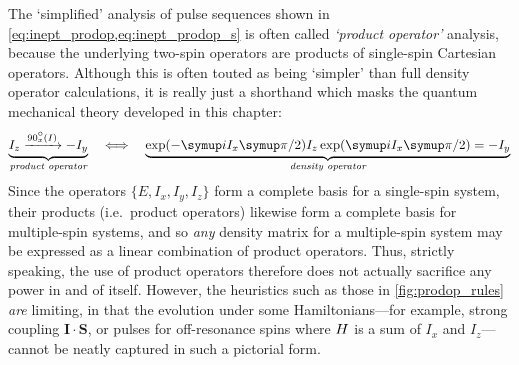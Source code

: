 The `simplified' analysis of pulse sequences shown in \cref{eq:inept_prodop,eq:inept_prodop_s} is often called \textit{`product operator'} analysis\autocite{Sorensen1984PNMRS}, because the underlying two-spin operators are products of single-spin Cartesian operators.
Although this is often touted as being `simpler' than full density operator calculations, it is really just a shorthand which masks the quantum mechanical theory developed in this chapter:
\begin{equation}
    \label{eq:product_operator_shorthand}
    \underbrace{I_z \xrightarrow{\angang{90}{x}(I)} -I_y}_{\textit{product operator}}
    \quad\Longleftrightarrow\quad
    \underbrace{\exp(-\mi I_x\cpi/2)I_z\exp(\mi I_x\cpi/2) = -I_y}_{\textit{density operator}}
\end{equation}
Since the operators $\{E, I_x, I_y, I_z\}$ form a complete basis for a single-spin system, their products (i.e.\ product operators) likewise form a complete basis for multiple-spin systems, and so \textit{any} density matrix for a multiple-spin system may be expressed as a linear combination of product operators.
Thus, strictly speaking, the use of product operators therefore does not actually sacrifice any power in and of itself.
However, the heuristics such as those in \cref{fig:prodop_rules} \textit{are} limiting, in that the evolution under some Hamiltonians---for example, strong coupling $\symbf{I}\cdot\symbf{S}$, or pulses for off-resonance spins where $H\/$ is a sum of $I_x$ and $I_z$---cannot be neatly captured in such a pictorial form.
